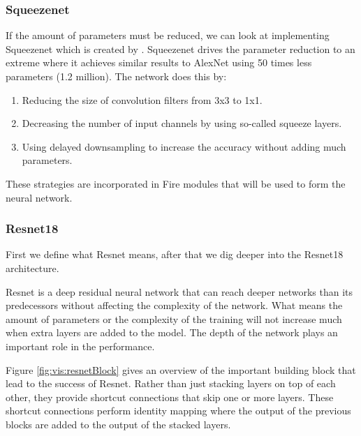 		
		\subsubsection{Squeezenet}
		
		If the amount of parameters must be reduced, we can look at implementing Squeezenet which is created by \cite{Iandola2017}. Squeezenet drives the parameter reduction to an extreme where it achieves similar results to AlexNet using 50 times less parameters (1.2 million). The network does this by:
		\begin{enumerate}
		\item Reducing the size of convolution filters from 3x3 to 1x1.
		\item Decreasing the number of input channels by using so-called squeeze layers.
		\item Using delayed downsampling to increase the accuracy without adding much parameters.
		\end{enumerate}
		
		These strategies are incorporated in Fire modules that will be used to form the neural network. 
		
			\subsubsection{Resnet18}
			First we define what Resnet \citep{He2016} means, after that we dig deeper into the Resnet18 architecture.
			
			Resnet is a deep residual neural network that can reach deeper networks than its predecessors without affecting the complexity of the network. What means the amount of parameters or the complexity of the training will not increase much when extra layers are added to the model. 
			The depth of the network plays an important role in the performance. 
			
			Figure \ref{fig:vis:resnetBlock} gives an overview of the important building block that lead to the success of Resnet.  Rather than just stacking layers on top of each other, they provide shortcut connections that skip one or more layers. These shortcut connections perform identity mapping where the output of the previous blocks are added to the output of the stacked layers. 
			
